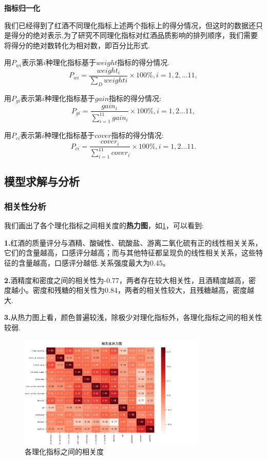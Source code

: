 \documentclass{whutmod}
\begin{document}
\textbf{指标归一化}

我们已经得到了红酒不同理化指标上述两个指标上的得分情况，但这时的数据还只是得分的绝对表示,为了研究不同理化指标对红酒品质影响的排列顺序，我们需要将得分的绝对数转化为相对数，即百分比形式.

用$P_{wi}$表示第$i$种理化指标基于$weight$指标的得分情况.
\begin{equation}
P_{wi}=\frac{weight_{i}}{\sum_{D} weight{i}}\times 100\%,i=1,2,...11,
\end{equation}

用$P_{gi}$表示第$i$种理化指标基于$gain$指标的得分情况:
\begin{equation}
P_{gi}=\frac{gain_{i}}{\sum_{i=1}^{11}gain_{i}}\times 100\%,i=1,2...11,
\end{equation}

用$P_{ci}$表示第$i$种理化指标基于$cover$指标的得分情况:
\begin{equation}
P_{ci}=\frac{cover_{i}}{\sum_{i=1}^{11}cover_{i}}\times 100\%,i=1,2...11.
\end{equation}

\subsection{模型求解与分析}

\subsubsection{相关性分析}
我们画出了各个理化指标之间相关度的\textbf{热力图}，如\ref{xiangguandu}，可以看到:

\textbf{1.}红酒的质量评分与酒精、酸碱性、硫酸盐、游离二氧化硫有正的线性相关关系，它们的含量越高，口感评分越高；而与其他特征都呈现负的线性相关关系，这些特征的含量越高，口感评分越低.关系强度最大为0.45。

\textbf{2.}酒精度和密度之间的相关性为-0.77，两者存在较大相关性，且酒精度越高，密度越小。密度和残糖的相关性为0.84，两者的相关性较大，且残糖越高，密度越大.

\textbf{3.}从热力图上看，颜色普遍较浅，除极少对理化指标外，各理化指标之间的相关性较弱.

\begin{figure}[!h]
	\centering
	\includegraphics[width=0.8\textwidth]{_corr.pdf}
	\caption{各理化指标之间的相关度}
\label{xiangguandu}
\end{figure}
\end{document}
